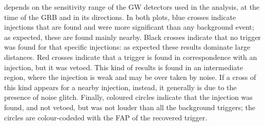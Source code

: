 \documentclass[binding=0.6cm, LaM]{sapthesis}
\begin{document}
	depends on the sensitivity range of the GW detectors used in the analysis, 
	at the time of the GRB and in its directions.
	In both plots, blue crosses indicate injections that are found 
	and were more significant than any background event;
	as expected, these are found mainly nearby.
	Black crosses indicate that no trigger was found for that specific injections: 
	as expected these results dominate large distances.
	Red crosses indicate that a trigger is found in correspondence with an injection, 			
	but it was vetoed.  
	This kind of results is found in an intermediate region, 
	where the injection is weak and may be over taken by noise.  
	If a cross of this kind appears for a nearby injection, instead, 
	it generally is due to the presence of noise glitch. 
	Finally, coloured circles indicate that the injection was found, and not vetoed, 
	but was not louder than all the background triggers;  
	the circles are colour-codeded with the FAP of the recovered trigger.
	
\end{document}
